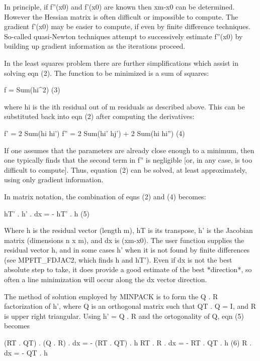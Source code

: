 \begin{DoxyVerb}
   In principle, if f''(x0) and f'(x0) are known then xm-x0 can be
   determined.  However the Hessian matrix is often difficult or
   impossible to compute.  The gradient f'(x0) may be easier to
   compute, if even by finite difference techniques.  So-called
   quasi-Newton techniques attempt to successively estimate f''(x0)
   by building up gradient information as the iterations proceed.

   In the least squares problem there are further simplifications
   which assist in solving eqn (2).  The function to be minimized is
   a sum of squares:

       f = Sum(hi^2)                                         (3)

   where hi is the ith residual out of m residuals as described
   above.  This can be substituted back into eqn (2) after computing
   the derivatives:

       f'  = 2 Sum(hi  hi')
       f'' = 2 Sum(hi' hj') + 2 Sum(hi hi'')                (4)

   If one assumes that the parameters are already close enough to a
   minimum, then one typically finds that the second term in f'' is
   negligible [or, in any case, is too difficult to compute].  Thus,
   equation (2) can be solved, at least approximately, using only
   gradient information.

   In matrix notation, the combination of eqns (2) and (4) becomes:

        hT' . h' . dx = - hT' . h                         (5)

   Where h is the residual vector (length m), hT is its transpose, h'
   is the Jacobian matrix (dimensions n x m), and dx is (xm-x0).  The
   user function supplies the residual vector h, and in some cases h'
   when it is not found by finite differences (see MPFIT_FDJAC2,
   which finds h and hT').  Even if dx is not the best absolute step
   to take, it does provide a good estimate of the best *direction*,
   so often a line minimization will occur along the dx vector
   direction.

   The method of solution employed by MINPACK is to form the Q . R
   factorization of h', where Q is an orthogonal matrix such that QT .
   Q = I, and R is upper right triangular.  Using h' = Q . R and the
   ortogonality of Q, eqn (5) becomes

        (RT . QT) . (Q . R) . dx = - (RT . QT) . h
         RT . R . dx = - RT . QT . h         (6)
              R . dx = - QT . h


\end{DoxyVerb}
